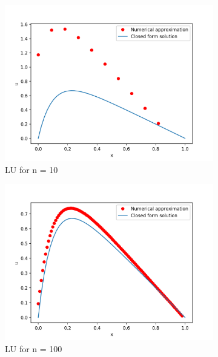 \documentclass[a4paper, english]{amsart} %
\begin{document}
\begin{figure}[H]
	\centering
	\begin{subfigure}[b]{0.3\linewidth}
		\includegraphics[width=\linewidth]{Figur/LU_10.png}
		\caption{LU for n = 10}
		\label{Fig_LU10}
	\end{subfigure}
	\begin{subfigure}[b]{0.3\linewidth}
		\includegraphics[width=\linewidth]{Figur/LU_100.png}
		\caption{LU for n = 100}
		\label{Fig_LU100}
	\end{subfigure}
	\begin{subfigure}[b]{0.3\linewidth}

\end{subfigure}
\end{figure}
\end{document}
